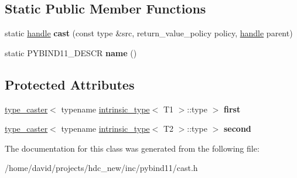 \subsection*{Static Public Member Functions}
\begin{DoxyCompactItemize}
\item 
static \hyperlink{classhandle}{handle} {\bfseries cast} (const type \&src, return\+\_\+value\+\_\+policy policy, \hyperlink{classhandle}{handle} parent)\hypertarget{classtype__caster_3_01std_1_1pair_3_01_t1_00_01_t2_01_4_01_4_a5c788f7b6ef1ebd1efbc004d0cbf3377}{}\label{classtype__caster_3_01std_1_1pair_3_01_t1_00_01_t2_01_4_01_4_a5c788f7b6ef1ebd1efbc004d0cbf3377}

\item 
static P\+Y\+B\+I\+N\+D11\+\_\+\+D\+E\+S\+CR {\bfseries name} ()\hypertarget{classtype__caster_3_01std_1_1pair_3_01_t1_00_01_t2_01_4_01_4_ae39263b3a8a08152c41a47a7e8dc237c}{}\label{classtype__caster_3_01std_1_1pair_3_01_t1_00_01_t2_01_4_01_4_ae39263b3a8a08152c41a47a7e8dc237c}

\end{DoxyCompactItemize}
\subsection*{Protected Attributes}
\begin{DoxyCompactItemize}
\item 
\hyperlink{classtype__caster}{type\+\_\+caster}$<$ typename \hyperlink{structintrinsic__type}{intrinsic\+\_\+type}$<$ T1 $>$\+::type $>$ {\bfseries first}\hypertarget{classtype__caster_3_01std_1_1pair_3_01_t1_00_01_t2_01_4_01_4_a2a7c2a36c4f173e861ced5efe53a51d3}{}\label{classtype__caster_3_01std_1_1pair_3_01_t1_00_01_t2_01_4_01_4_a2a7c2a36c4f173e861ced5efe53a51d3}

\item 
\hyperlink{classtype__caster}{type\+\_\+caster}$<$ typename \hyperlink{structintrinsic__type}{intrinsic\+\_\+type}$<$ T2 $>$\+::type $>$ {\bfseries second}\hypertarget{classtype__caster_3_01std_1_1pair_3_01_t1_00_01_t2_01_4_01_4_a78901f56c206dbb879569d2eeb48c4a0}{}\label{classtype__caster_3_01std_1_1pair_3_01_t1_00_01_t2_01_4_01_4_a78901f56c206dbb879569d2eeb48c4a0}

\end{DoxyCompactItemize}


The documentation for this class was generated from the following file\+:\begin{DoxyCompactItemize}
\item 
/home/david/projects/hdc\+\_\+new/inc/pybind11/cast.\+h\end{DoxyCompactItemize}
